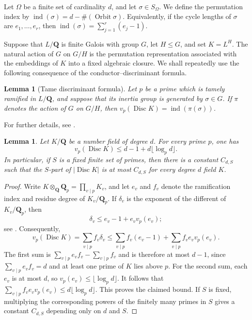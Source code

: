 \documentclass[11pt,hidelinks]{amsart}
\newtheorem{lemma}[theorem]{Lemma}
\newcommand{\Q}{\mathbf Q}
\newcommand{\ind}{\operatorname{ind}}
\newcommand{\Disc}{\operatorname{Disc}}
\begin{document}
Let $\Omega$ be a finite set of cardinality $d$, and let $\sigma\in S_\Omega$. We define the permutation index by
$\ind(\sigma)=d-\#(\operatorname{Orbit}\sigma)$. Equivalently, if the cycle lengths of $\sigma$ are $e_1,\ldots,e_r$, then $\ind(\sigma)=\sum_{j=1}^r(e_j-1)$.

Suppose that $L/\Q$ is finite Galois with group $G$, let $H\leq G$, and set $K=L^H$. The natural action of $G$ on $G/H$ is the permutation representation associated with the embeddings of $K$ into a fixed algebraic closure. We shall repeatedly use the following consequence of the conductor--discriminant formula.

\begin{lemma}[Tame discriminant formula]\label{lem:tame-disc}
Let $p$ be a prime which is tamely ramified in $L/\Q$, and suppose that its inertia group is generated by $\sigma\in G$. If $\pi$ denotes the action of $G$ on $G/H$, then $v_p(\Disc K)=\ind(\pi(\sigma))$.
\end{lemma}

For further details, see \cite[Chapter VI, \S2]{SerreLocalFields}.


\begin{lemma}\label{lem:fixed-prime}
Let $K/\Q$ be a number field of degree $d$. For every prime $p$, one has \[v_p(\Disc K)\leq d-1+d\lfloor\log_p d\rfloor.\] In particular, if $S$ is a fixed finite set of primes, then there is a constant $C_{d,S}$ such that the $S$-part of $|\Disc K|$ is at most $C_{d,S}$ for every degree $d$ field $K$.
\end{lemma}

\begin{proof}
Write $K\otimes_\Q\Q_p=\prod_{v\mid p}K_v$, and let $e_v$ and $f_v$ denote the ramification index and residue degree of
$K_v/\Q_p$.  If $\delta_v$ is the exponent of the different of
$K_v/\Q_p$, then
\[\delta_v\leq e_v-1+e_vv_p(e_v);\] see
\cite[Chapter III, \S6]{SerreLocalFields}.  Consequently,
\[
 v_p(\Disc K)=\sum_{v\mid p}f_v\delta_v
 \leq
 \sum_{v\mid p}f_v(e_v-1)
 +\sum_{v\mid p}f_ve_vv_p(e_v).
\]
The first sum is
$\sum_{v\mid p}e_vf_v-\sum_{v\mid p}f_v$ and is therefore at most
$d-1$, since $\sum_{v\mid p}e_vf_v=d$ and at least one prime of $K$
lies above $p$.  For the second sum, each $e_v$ is at most $d$, so
$v_p(e_v)\leq\lfloor\log_p d\rfloor$.  It follows that $\sum_{v\mid p}f_ve_vv_p(e_v)\leq d\lfloor\log_p d\rfloor$. This proves the claimed bound.  If $S$ is fixed, multiplying the
corresponding powers of the finitely many primes in $S$ gives a constant
$C_{d,S}$ depending only on $d$ and $S$.
\end{proof}
\end{document}
